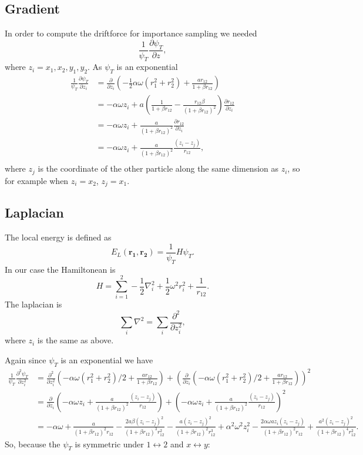 \documentclass[a4paper,norsk,10pt]{article}
\newcommand{\bb}[1]{\boldsymbol{#1}}
\newcommand{\p}{\partial}
\newcommand{\pddt}[2]{\frac{\p #1}{\p #2}}
\newcommand{\pndt}[3]{\frac{\p^{#3} #1}{\p #2^{#3}}}
\newcommand{\f}{\frac}
\begin{document}
\subsection{Gradient}\label{app2pg}
In order to compute the driftforce for importance sampling we needed
\[\f{1}{\psi_T}\pddt{\psi_T}{z},\]
where \(z_i = x_1,x_2,y_1,y_2\).
As \(\psi_T\) is an exponential
\begin{align*}
  \f{1}{\psi_T}\pddt{\psi_T}{z_i} &= \pddt{}{z_i}\left(-\f{1}{2}\alpha\omega(r_1^2+r_2^2) + \f{ar_{12}}{1+\beta r_{12}}\right)\\
  &= -\alpha\omega z_i + a\left(\f{1}{1+\beta r_{12}} - \f{r_{12}\beta}{(1+\beta r_{12})^2}\right)\pddt{r_{12}}{z_i}\\
  &= -\alpha\omega z_i + \f{a}{(1+\beta r_{12})^2}\pddt{r_{12}}{z_i}\\
  &= -\alpha\omega z_i + \f{a}{(1+\beta r_{12})^2}\f{(z_i-z_j)}{r_{12}},\\
\end{align*}
where \(z_j\) is the coordinate of the other particle along the same dimension as \(z_i\), so for example when
\(z_i=x_2\), \(z_j = x_1\).

\subsection{Laplacian}\label{applap}

The local energy is defined as
\[E_L(\bb{r_1},\bb{r_2}) = \f{1}{\psi_T}H\psi_T.\]
In our case the Hamiltonean is
\[H = \sum_{i=1}^2-\f{1}{2}\nabla_i^2+\f{1}{2}\omega^2r_i^2 + \f{1}{r_{12}}.\]
The laplacian is
\[\sum_i\nabla^2 = \sum_i\pndt{}{z_i}{2},\]
where \(z_i\) is the same as above.

Again since \(\psi_T\) is an exponential we have
\begin{align*}
  \f{1}{\psi_T}\pndt{\psi_T}{z_i}{2} &= \pndt{}{z_i}{2}\left(-\alpha\omega(r_1^2+r_2^2)/2 + \f{ar_{12}}{1+\beta r_{12}}\right) +
    \left(\pddt{}{z_i}\left(-\alpha\omega(r_1^2+r_2^2)/2 + \f{ar_{12}}{1+\beta r_{12}}\right)\right)^2\\
    &= \pddt{}{z_i}\left(-\alpha\omega z_i + \f{a}{(1+\beta r_{12})^2}\f{(z_i-z_j)}{r_{12}}\right) +
    \left(-\alpha\omega z_i + \f{a}{(1+\beta r_{12})^2}\f{(z_i-z_j)}{r_{12}}\right)^2\\
    &= -\alpha\omega + \f{a}{(1+\beta r_{12})^2r_{12}} - \f{2a\beta(z_i-z_j)^2}{(1+\beta r_{12})^3r_{12}^2}
    - \f{a(z_i-z_j)^2}{(1+\beta r_{12})^2r_{12}^3} + \alpha^2\omega^2z_i^2 -
    \f{2\alpha\omega a z_i(z_i-z_j)}{(1+\beta r_{12})^2r_{12}} + \f{a^2(z_i-z_j)^2}{(1+\beta r_{12})^4r_{12}^2}.
\end{align*}
So, because the $\psi_T$ is symmetric under $1\leftrightarrow 2$ and $x\leftrightarrow y$:
\end{document}
